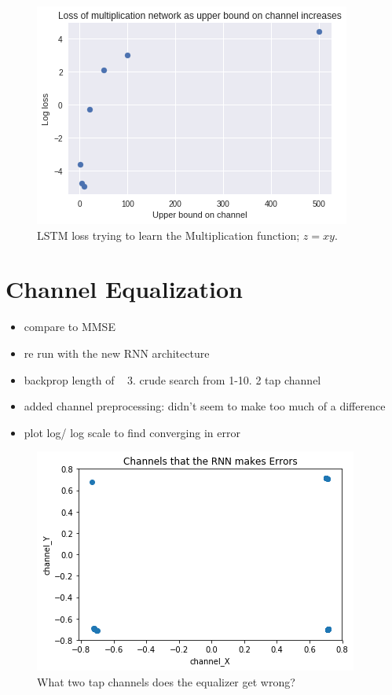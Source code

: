 \begin{figure}
\begin{center}
\includegraphics{figures/equal/Channel_upper_bound_multiplication.png}
\caption{LSTM loss trying to learn the Multiplication function; $z=xy$.}
\end{center}
\label{fig:mult_bound}
\end{figure}


\section{Channel Equalization}

\begin{itemize}
\item compare to MMSE
\item re run with the new RNN architecture
\item backprop length of ~ 3. crude search from 1-10. 2 tap channel
\item added channel preprocessing: didn't seem to make too much of a difference
\item plot log/ log scale to find converging in error
\end{itemize}

\begin{figure}
\begin{center}
\includegraphics{figures/equal/incorrect_channels.png}
\caption{What two tap channels does the equalizer get wrong?}
\end{center}
\label{fig:incorr_chan}
\end{figure}
